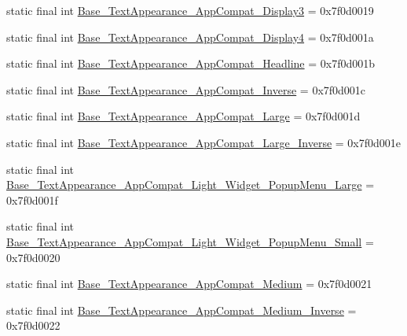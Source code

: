 \begin{DoxyCompactItemize}
\item 
static final int \mbox{\hyperlink{classandroid_1_1support_1_1v7_1_1appcompat_1_1R_1_1style_a0380dc8d70a5eb7c2607df2a22960d42}{Base\+\_\+\+Text\+Appearance\+\_\+\+App\+Compat\+\_\+\+Display3}} = 0x7f0d0019
\item 
static final int \mbox{\hyperlink{classandroid_1_1support_1_1v7_1_1appcompat_1_1R_1_1style_a6cddb219261317aad3f4db784e410f78}{Base\+\_\+\+Text\+Appearance\+\_\+\+App\+Compat\+\_\+\+Display4}} = 0x7f0d001a
\item 
static final int \mbox{\hyperlink{classandroid_1_1support_1_1v7_1_1appcompat_1_1R_1_1style_a76b5b2690dec115d1cb2ab231a53b3e3}{Base\+\_\+\+Text\+Appearance\+\_\+\+App\+Compat\+\_\+\+Headline}} = 0x7f0d001b
\item 
static final int \mbox{\hyperlink{classandroid_1_1support_1_1v7_1_1appcompat_1_1R_1_1style_ac1b8f71eef0cfd92420b53d40b848492}{Base\+\_\+\+Text\+Appearance\+\_\+\+App\+Compat\+\_\+\+Inverse}} = 0x7f0d001c
\item 
static final int \mbox{\hyperlink{classandroid_1_1support_1_1v7_1_1appcompat_1_1R_1_1style_ac0e1bd870f1c3957fda8a93a43cc2248}{Base\+\_\+\+Text\+Appearance\+\_\+\+App\+Compat\+\_\+\+Large}} = 0x7f0d001d
\item 
static final int \mbox{\hyperlink{classandroid_1_1support_1_1v7_1_1appcompat_1_1R_1_1style_a952c581262566629af4bcce8dcb124fe}{Base\+\_\+\+Text\+Appearance\+\_\+\+App\+Compat\+\_\+\+Large\+\_\+\+Inverse}} = 0x7f0d001e
\item 
static final int \mbox{\hyperlink{classandroid_1_1support_1_1v7_1_1appcompat_1_1R_1_1style_a7bdfa04a7bd06b56701a037df0d1d2df}{Base\+\_\+\+Text\+Appearance\+\_\+\+App\+Compat\+\_\+\+Light\+\_\+\+Widget\+\_\+\+Popup\+Menu\+\_\+\+Large}} = 0x7f0d001f
\item 
static final int \mbox{\hyperlink{classandroid_1_1support_1_1v7_1_1appcompat_1_1R_1_1style_acf3a49f92e11ba58887e56c6237d01b2}{Base\+\_\+\+Text\+Appearance\+\_\+\+App\+Compat\+\_\+\+Light\+\_\+\+Widget\+\_\+\+Popup\+Menu\+\_\+\+Small}} = 0x7f0d0020
\item 
static final int \mbox{\hyperlink{classandroid_1_1support_1_1v7_1_1appcompat_1_1R_1_1style_a052584a879536e446cb21f559053a2fd}{Base\+\_\+\+Text\+Appearance\+\_\+\+App\+Compat\+\_\+\+Medium}} = 0x7f0d0021
\item 
static final int \mbox{\hyperlink{classandroid_1_1support_1_1v7_1_1appcompat_1_1R_1_1style_a94e8c40fadcc9eea80252cf4e36c4568}{Base\+\_\+\+Text\+Appearance\+\_\+\+App\+Compat\+\_\+\+Medium\+\_\+\+Inverse}} = 0x7f0d0022

\end{DoxyCompactItemize}
